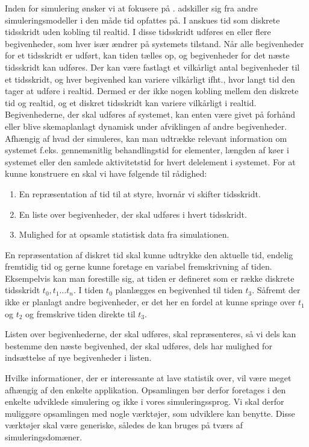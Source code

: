 Inden for simulering ønsker vi at fokusere på \des. \des adskiller sig fra andre simuleringsmodeller i den måde tid opfattes på. I \des anskues tid som diskrete tidsskridt uden kobling til realtid. I disse tidsskridt udføres en eller flere begivenheder, som hver især ændrer på systemets tilstand. Når alle begivenheder for et tidsskridt er udført, kan tiden tælles op, og begivenheder for det næste tidsskridt kan udføres. Der kan være fastlagt et vilkårligt antal begivenheder til et tidsskridt, og hver begivenhed kan variere vilkårligt ifht., hvor langt tid den tager at udføre i realtid. Dermed er der ikke nogen kobling mellem den diskrete tid og realtid, og et diskret tidsskridt kan variere vilkårligt i realtid. Begivenhederne, der skal udføres af systemet, kan enten være givet på forhånd eller blive skemaplanlagt dynamisk under afviklingen af andre begivenheder. 
Afhængig af hvad der simuleres, kan man udtrække relevant information om systemet f.eks. gennemsnitlig behandlingstid for elementer, længden af køer i systemet eller den samlede aktivitetstid for hvert delelement i systemet.
For at kunne konstruere en \des skal vi have følgende til rådighed:
\begin{enumerate}
\tightlist 
\item En repræsentation af tid til at styre, hvornår vi skifter tidsskridt.
\item En liste over begivenheder, der skal udføres i hvert tidsskridt.
\item Mulighed for at opsamle statistisk data fra simulationen. 
\end{enumerate}
En repræsentation af diskret tid skal kunne udtrykke den aktuelle tid, endelig fremtidig tid og gerne kunne foretage en variabel fremskrivning af tiden. Eksempelvis kan man forestille sig, at tiden er defineret som er række diskrete tidsskridt $t_0, t_1 \ldots t_n$. I tiden $t_{0}$ planlægges en begivenhed til tiden $t_{3}$. Såfremt der ikke er planlagt andre begivenheder, er det her en fordel at kunne springe over $t_{1}$ og $t_{2}$ og fremskrive tiden direkte til $t_{3}$.

Listen over begivenhederne, der skal udføres, skal repræsenteres, så vi dels kan bestemme den næste begivenhed, der skal udføres, dels har mulighed for indsættelse af nye begivenheder i listen.

Hvilke informationer, der er interessante at lave statistik over, vil være meget afhængig af den enkelte applikation. Opsamlingen bør derfor foretages i den enkelte udviklede simulering og ikke i vores simuleringssprog. Vi skal derfor muliggøre opsamlingen med nogle værktøjer, som udviklere kan benytte. Disse værktøjer skal være generiske, således de kan bruges på tværs af simuleringsdomæner. 


